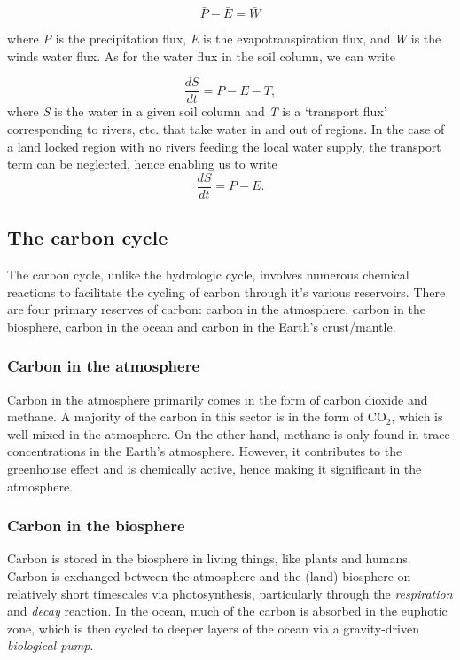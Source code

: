 \documentclass[11pt]{article}
\numberwithin{equation}{section}
\begin{document}
\begin{equation}
\bar{P} - \bar{E} = \bar{W}
\end{equation}

where \textit{P} is the precipitation flux, \textit{E} is the evapotranspiration flux, and \textit{W} is the winds water flux. As for the water flux in the soil column, we can write 

\begin{equation}
\dfrac{dS}{dt} = P - E - T,
\end{equation}
where \textit{S} is the water in a given soil column and \textit{T} is a `transport flux' corresponding to rivers, etc. that take water in and out of regions. In the case of a land locked region with no rivers feeding the local water supply, the transport term can be neglected, hence enabling us to write
\begin{equation}
\dfrac{dS}{dt} = P - E.
\end{equation}

\subsection{The carbon cycle}

The carbon cycle, unlike the hydrologic cycle, involves numerous chemical reactions to facilitate the cycling of carbon through it's various reservoirs. There are four primary reserves of carbon: carbon in the atmosphere, carbon in the biosphere, carbon in the ocean and carbon in the Earth's crust/mantle. 

\subsubsection{Carbon in the atmosphere}

Carbon in the atmosphere primarily comes in the form of carbon dioxide and methane. A majority of the carbon in this sector is in the form of CO$_2$, which is well-mixed in the atmosphere. On the other hand, methane is only found in trace concentrations in the Earth's atmosphere. However, it contributes to the greenhouse effect and is chemically active, hence making it significant in the atmosphere. 

\subsubsection{Carbon in the biosphere}

Carbon is stored in the biosphere in living things, like plants and humans. Carbon is exchanged between the atmosphere and the (land) biosphere on relatively short timescales via photosynthesis, particularly through the \textit{respiration} and \textit{decay} reaction. In the ocean, much of the carbon is absorbed in the euphotic zone, which is then cycled to deeper layers of the ocean via a gravity-driven \textit{biological pump}. 
\end{document}
